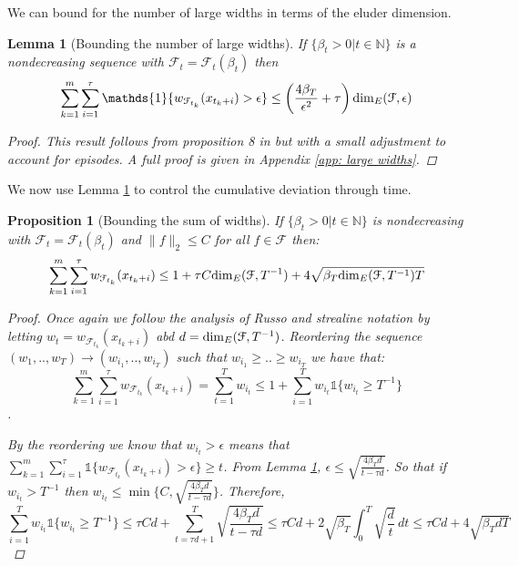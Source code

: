 \documentclass{article}
\newtheorem{lemma}{Lemma}
\newtheorem{prop}{Proposition}
\newcommand{\Nat}{\mathbb{N}}
\newcommand{\Ind}{\mathds{1}}
\newcommand{\Fc}{\mathcal{F}}
\begin{document}
We can bound for the number of large widths in terms of the eluder dimension.

\begin{lemma}[Bounding the number of large widths]
\hspace{0.00000000000001mm} \newline
\label{lem: big widths}
If $\{ \beta_t >0 \big| t \in \Nat \}$ is a nondecreasing sequence with $\Fc_t = \Fc_t(\beta_t)$ then
$$ \sum_{k=1}^m \sum_{i=1}^\tau \Ind \{w_{\Fc_{t_k}}(x_{t_k+i}) > \epsilon \} \le
	\left( \frac{4\beta_T}{\epsilon^2}+ \tau \right) {\rm dim}_E(\Fc,\epsilon) $$

\begin{proof}
This result follows from proposition 8 in \cite{russo2013} but with a small adjustment to account for episodes. A full proof is given in Appendix \ref{app: large widths}.
\end{proof}
\end{lemma}

We now use Lemma \ref{lem: big widths} to control the cumulative deviation through time.
\begin{prop}[Bounding the sum of widths]
\hspace{0.00000000000001mm} \newline
\label{prop: widths}
If $\{ \beta_t >0 \big| t \in \Nat \}$ is nondecreasing with $\Fc_t = \Fc_t(\beta_t)$ and $\|f\|_2 \le C$ for all $f \in \Fc$ then:
\begin{equation}
	\sum_{k=1}^m \sum_{i=1}^\tau w_{\Fc_{t_k}}(x_{t_k+i}) \le
	1 + \tau C {\rm dim}_E(\Fc,T^{-1}) + 4\sqrt{\beta_T {\rm dim}_E(\Fc,T^{-1}) T}
\end{equation}

\begin{proof}
Once again we follow the analysis of Russo \cite{russo2013} and strealine notation by letting $w_t = w_{\Fc_{t_k}}(x_{t_k+i})$ abd $d = {\rm dim}_E(\Fc,T^{-1})$.
Reordering the sequence $(w_1,..,w_T) \rightarrow (w_{i_1},..,w_{i_T})$ such that $w_{i_1}\ge..\ge w_{i_T}$
we have that:
$$ \sum_{k=1}^m \sum_{i=1}^\tau w_{\mathcal{F}_{t_k}}(x_{t_k+i})  = \sum_{t=1}^T w_{i_t} \le 1 + \sum_{i=1}^T w_{i_t} \Ind \{ w_{i_t} \ge T^{-1} \} $$.

By the reordering we know that $w_{i_t} > \epsilon$ means that $\sum_{k=1}^m \sum_{i=1}^\tau \Ind \{w_{\Fc_{t_k}}(x_{t_k+i}) > \epsilon \} \ge t $.
From Lemma \ref{lem: big widths}, $\epsilon \le \sqrt{\frac{4 \beta_T d}{t - \tau d}}$.
So that if $w_{i_t} > T^{-1}$ then $w_{i_t} \le \min \{ C , \sqrt{\frac{4 \beta_T d}{t - \tau d}} \}$. Therefore,
$$\sum_{i=1}^T w_{i_t} \Ind \{ w_{i_t} \ge T^{-1} \} \le \tau C d + \sum_{t=\tau d +1}^T \sqrt{\frac{4 \beta_T d}{t - \tau d}} \le
\tau C d + 2 \sqrt{\beta_T} \int_0^T \sqrt{ \frac{d}{t} } \,dt \le \tau C d + 4 \sqrt{\beta_T d T}$$

\end{proof}

\end{prop}
\end{document}
